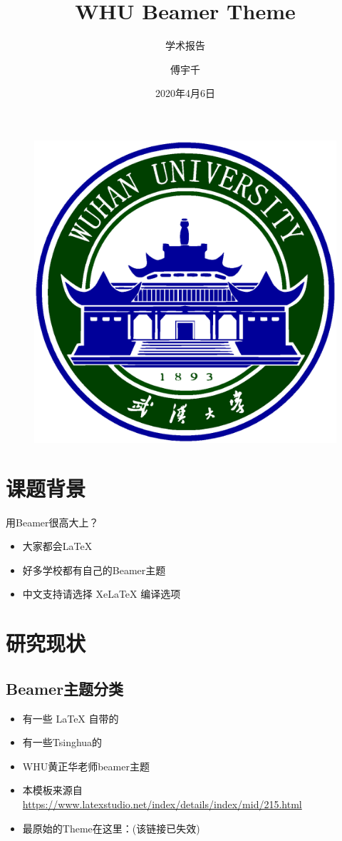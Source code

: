 \documentclass{beamer}
\author{傅宇千}
\title{WHU Beamer Theme}
\subtitle{学术报告}
\institute{武汉大学电子信息学院}
\date{2020年4月6日}
\begin{document}
\kaishu
\begin{frame}
	\titlepage
	\begin{figure}[htpb]
		\begin{center}
			\includegraphics[width=0.2\linewidth]{pic/whulogo.eps}
		\end{center}
	\end{figure}
\end{frame}
\begin{frame}
\tableofcontents[sectionstyle=show,subsectionstyle=show/shaded/hide,subsubsectionstyle=show/shaded/hide]
\end{frame}


\section{课题背景}

\begin{frame}{用Beamer很高大上？}
\begin{itemize}
\item 大家都会\LaTeX{}
\item 好多学校都有自己的Beamer主题
\item 中文支持请选择 Xe\LaTeX{} 编译选项
\end{itemize}
\end{frame}

\section{研究现状}

\subsection{Beamer主题分类}

\begin{frame}
\begin{itemize}
\item 有一些 \LaTeX{} 自带的
\item 有一些Tsinghua的
\item WHU黄正华老师beamer主题
\item 本模板来源自 \newline \url{https://www.latexstudio.net/index/details/index/mid/215.html}
\item 最原始的Theme在这里：\cite{origin}(该链接已失效)
\end{itemize}
\end{frame}
\end{document}
